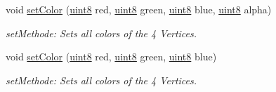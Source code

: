 \begin{DoxyCompactItemize}
void \hyperlink{class_f2_c_1_1_sprite_element_abd8a9e793229dcc55eb2d80741e53e04}{setColor} (\hyperlink{namespace_f2_c_a711deb33697d145669b9c0c4fe87c7ca}{uint8} red, \hyperlink{namespace_f2_c_a711deb33697d145669b9c0c4fe87c7ca}{uint8} green, \hyperlink{namespace_f2_c_a711deb33697d145669b9c0c4fe87c7ca}{uint8} blue, \hyperlink{namespace_f2_c_a711deb33697d145669b9c0c4fe87c7ca}{uint8} alpha)
\begin{DoxyCompactList}\small\item\em setMethode: Sets all colors of the 4 Vertices. \item\end{DoxyCompactList}\item 
void \hyperlink{class_f2_c_1_1_sprite_element_adb9192dc0d48987416570e4c3f470fe2}{setColor} (\hyperlink{namespace_f2_c_a711deb33697d145669b9c0c4fe87c7ca}{uint8} red, \hyperlink{namespace_f2_c_a711deb33697d145669b9c0c4fe87c7ca}{uint8} green, \hyperlink{namespace_f2_c_a711deb33697d145669b9c0c4fe87c7ca}{uint8} blue)
\begin{DoxyCompactList}\small\item\em setMethode: Sets all colors of the 4 Vertices. \item\end{DoxyCompactList}\end{DoxyCompactItemize}
